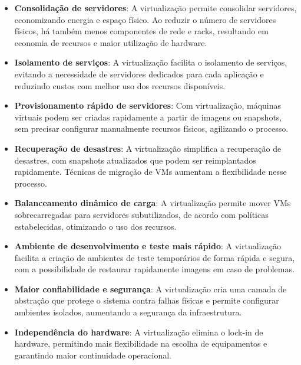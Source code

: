 \begin{itemize}
  \item \textbf{Consolidação de servidores}: A virtualização permite consolidar servidores, economizando energia e espaço físico. Ao reduzir o número de servidores físicos, há também menos componentes de rede e racks, resultando em economia de recursos e maior utilização de hardware.

  \item \textbf{Isolamento de serviços}: A virtualização facilita o isolamento de serviços, evitando a necessidade de servidores dedicados para cada aplicação e reduzindo custos com melhor uso dos recursos disponíveis.

  \item \textbf{Provisionamento rápido de servidores}: Com virtualização, máquinas virtuais podem ser criadas rapidamente a partir de imagens ou snapshots, sem precisar configurar manualmente recursos físicos, agilizando o processo.

  \item \textbf{Recuperação de desastres}: A virtualização simplifica a recuperação de desastres, com snapshots atualizados que podem ser reimplantados rapidamente. Técnicas de migração de VMs aumentam a flexibilidade nesse processo.

  \item \textbf{Balanceamento dinâmico de carga}: A virtualização permite mover VMs sobrecarregadas para servidores subutilizados, de acordo com políticas estabelecidas, otimizando o uso dos recursos.

  \item \textbf{Ambiente de desenvolvimento e teste mais rápido}: A virtualização facilita a criação de ambientes de teste temporários de forma rápida e segura, com a possibilidade de restaurar rapidamente imagens em caso de problemas.

  \item \textbf{Maior confiabilidade e segurança}: A virtualização cria uma camada de abstração que protege o sistema contra falhas físicas e permite configurar ambientes isolados, aumentando a segurança da infraestrutura.

  \item \textbf{Independência do hardware}: A virtualização elimina o lock-in de hardware, permitindo mais flexibilidade na escolha de equipamentos e garantindo maior continuidade operacional.
\end{itemize}


